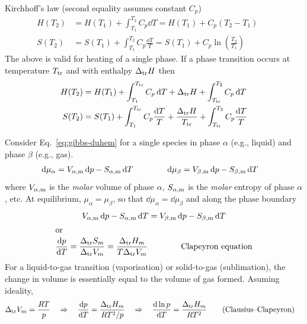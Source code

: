 \documentclass[11pt,a4paper,twoside]{article}
\numberwithin{equation}{section}
\newcommand{\eqn}[1]{Eq.~\eqref{#1}}
\begin{document}
Kirchhoff's law (second equality assumes constant $C_p$)
\begin{align}
    H(T_2) & = H(T_1) + \int_{T_{1}}^{T_{2}} C_{p} \dd{T} = H(T_1) + C_{p} (T_2 - T_1)  & & \\
    S(T_2) & = S(T_1) + \int_{T_{1}}^{T_{2}} C_{p} \frac{\dd{T}}{T} = 
    S(T_1) + C_{p} \ln(\frac{T_2}{T_1})
\end{align}
The above is valid for heating of a single phase. If a phase transition occurs at temperature $T_{\rm tr}$ and with enthalpy $\Delta_{\rm tr} H$ 
then
\begin{align}
    H(T_2) & = H(T_1) + \int_{T_{1}}^{T_{\rm tr}} C_{p} \dd{T} + \Delta_{\rm tr} H + \int_{T_{\rm tr}}^{T_{2}} C_{p} \dd{T} \\
    S(T_2) & = S(T_1) + \int_{T_{1}}^{T_{\rm tr}} C_{p} \frac{\dd{T}}{T} + \frac{\Delta_{\rm tr} H}{T_{\rm tr}} + \int_{T_{\rm tr}}^{T_{2}} C_{p} \frac{\dd{T}}{T} 
\end{align}

Consider \eqn{eq:gibbs-duhem} for a single species in phase $\alpha$ (e.g., liquid) and phase $\beta$ (e.g., gas). 
\begin{align}
    \dd{\mu_{\alpha}} & = V_{\alpha, {\rm m}} \dd{p} - S_{\alpha, {\rm m}} \dd{T} \qquad \qquad
    \dd{\mu_{\beta}} = V_{\beta, {\rm m}} \dd{p} - S_{\beta, {\rm m}} \dd{T} 
\end{align}
where $V_{\alpha, {\rm m}}$ is the \emph{molar} volume of phase $\alpha$, 
$S_{\alpha, {\rm m}}$ is the \emph{molar} entropy of phase $\alpha$, etc. 
At equilibrium, $\mu_{\alpha} = \mu_{\beta}$, so that
$ \dd{\mu}_{\alpha} =  \dd{\mu}_{\beta}$ and along the phase boundary
\begin{gather}
    V_{\alpha, {\rm m}} \dd{p} - S_{\alpha, {\rm m}} \dd{T} = 
    V_{\beta, {\rm m}} \dd{p} - S_{\beta, {\rm m}} \dd{T} \\
    \shortintertext{or}
    \dv{p}{T} = \frac{\Delta_{\rm tr} S_{m}}{\Delta_{\rm tr} V_{m}}
    = \frac{\Delta_{\rm tr} H_{m}}{T \Delta_{\rm tr} V_{m}}
    \qquad \qquad \text{Clapeyron equation}
\end{gather}
For a liquid-to-gas transition (vaporisation) or solid-to-gas (sublimation), the change in volume is essentially equal to the volume of gas formed. Asuming ideality,
\begin{align}
    \Delta_{\rm tr} V_{m} & = \frac{R T}{p} \quad \Rightarrow \quad
    \dv{p}{T} = \frac{\Delta_{\rm tr} H_{m}}{R T^2 / p}  \quad \Rightarrow \quad
    \dv{\ln p}{T}  = \frac{\Delta_{\rm tr} H_{m}}{R T^2} \qquad 
    \text{(Clausius--Clapeyron)}
\end{align}
\end{document}
